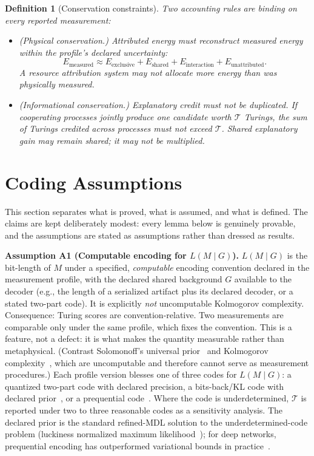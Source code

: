 \documentclass[11pt]{article}
\newtheorem{definition}{Definition}
\begin{document}
\begin{definition}[Conservation constraints]
Two accounting rules are binding on every reported measurement:
\begin{itemize}
\item \textit{(Physical conservation.)} Attributed energy must reconstruct measured energy within the profile's declared uncertainty:
\[
E_{\text{measured}} \approx E_{\text{exclusive}} + E_{\text{shared}} + E_{\text{interaction}} + E_{\text{unattributed}}.
\]
A resource attribution system may not allocate more energy than was physically measured.
\item \textit{(Informational conservation.)} Explanatory credit must not be duplicated. If cooperating processes jointly produce one candidate worth \(\mathcal{T}\) Turings, the sum of Turings credited across processes must not exceed \(\mathcal{T}\). Shared explanatory gain may remain shared; it may not be multiplied.
\end{itemize}
\end{definition}

\section{Coding Assumptions}

This section separates what is proved, what is assumed, and what is defined. The claims are kept deliberately modest: every lemma below is genuinely provable, and the assumptions are stated as assumptions rather than dressed as results.

\textbf{Assumption A1 (Computable encoding for \(L(M\mid G)\)).} \(L(M\mid G)\) is the bit-length of \(M\) under a specified, \textit{computable} encoding convention declared in the measurement profile, with the declared shared background \(G\) available to the decoder (e.g., the length of a serialized artifact plus its declared decoder, or a stated two-part code). It is explicitly \textit{not} uncomputable Kolmogorov complexity. Consequence: Turing scores are convention-relative. Two measurements are comparable only under the same profile, which fixes the convention. This is a feature, not a defect: it is what makes the quantity measurable rather than metaphysical. (Contrast Solomonoff's universal prior~\cite{solomonoff1964} and Kolmogorov complexity~\cite{kolmogorov1965}, which are uncomputable and therefore cannot serve as measurement procedures.) Each profile version blesses one of three codes for \(L(M\mid G)\): a quantized two-part code with declared precision, a bits-back/KL code with declared prior~\cite{hinton1993}, or a prequential code~\cite{dawid1984}. Where the code is underdetermined, \(\mathcal{T}\) is reported under two to three reasonable codes as a sensitivity analysis. The declared prior is the standard refined-MDL solution to the underdetermined-code problem (luckiness normalized maximum likelihood~\cite{grunwald2007}); for deep networks, prequential encoding has outperformed variational bounds in practice~\cite{blier2018}.
\end{document}
